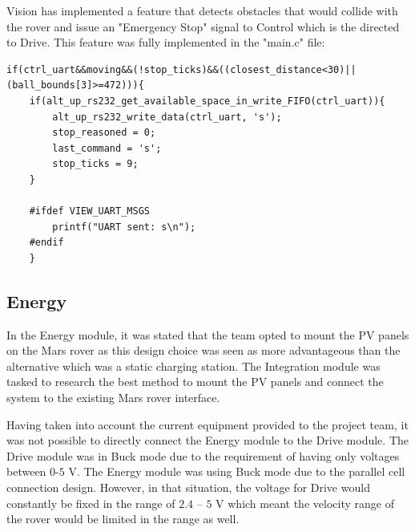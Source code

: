 \documentclass[11pt, a4paper]{article}
\begin{document}
Vision has implemented a feature that detects obstacles that would collide with the rover and issue an "Emergency Stop" signal to Control which is the directed to Drive. This feature was fully implemented in the "main.c" file:
\begin{lstlisting}
if(ctrl_uart&&moving&&(!stop_ticks)&&((closest_distance<30)||(ball_bounds[3]>=472))){
    if(alt_up_rs232_get_available_space_in_write_FIFO(ctrl_uart)){
        alt_up_rs232_write_data(ctrl_uart, 's');
        stop_reasoned = 0;
        last_command = 's';
        stop_ticks = 9;
    }

    #ifdef VIEW_UART_MSGS
        printf("UART sent: s\n");
    #endif
    }

\end{lstlisting}

\pagebreak

\subsection{Energy}

In the Energy module, it was stated that the team opted to mount the PV panels on the Mars rover as this design choice was seen as more advantageous than the alternative which was a static charging station. The Integration module was tasked to research the best method to mount the PV panels and connect the system to the existing Mars rover interface. 

Having taken into account the current equipment provided to the project team, it was not possible to directly connect the Energy module to the Drive module. The Drive module was in Buck mode due to the requirement of having only voltages between $0$-$5$ V. The Energy module was using Buck mode due to the parallel cell connection design. However, in that situation, the voltage for Drive would constantly be fixed in the range of $2.4$ – $5$ V which meant the velocity range of the rover would be limited in the range as well.
\end{document}
